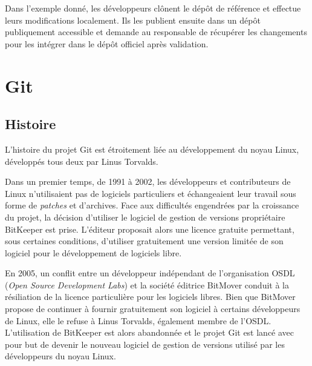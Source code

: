 \documentclass[11pt,a4paper]{article}
\begin{document}
Dans l'exemple donné, les développeurs clônent le dépôt de référence et effectue leurs modifications localement.
Ils les publient ensuite dans un dépôt publiquement accessible et demande au responsable de récupérer les changements pour les intégrer dans le dépôt officiel après validation.


\section{Git}


\subsection{Histoire}

L'histoire du projet Git est étroitement liée au développement du noyau Linux, développés tous deux par Linus Torvalds.

Dans un premier temps, de 1991 à 2002, les développeurs et contributeurs de Linux n'utilisaient pas de logiciels particuliers et échangeaient leur travail sous forme de \textit{patches} et d'archives.
Face aux difficultés engendrées par la croissance du projet, la décision d'utiliser le logiciel de gestion de versions propriétaire BitKeeper est prise.
L'éditeur proposait alors une licence gratuite permettant, sous certaines conditions, d'utiliser gratuitement une version limitée de son logiciel pour le développement de logiciels libre.

En 2005, un conflit entre un développeur indépendant de l'organisation OSDL (\textit{Open Source Development Labs}) et la société éditrice BitMover conduit à la résiliation de la licence particulière pour les logiciels libres.
Bien que BitMover propose de continuer à fournir gratuitement son logiciel à certains développeurs de Linux, elle le refuse à Linus Torvalds, également membre de l'OSDL.
L'utilisation de BitKeeper est alors abandonnée et le projet Git est lancé avec pour but de devenir le nouveau logiciel de gestion de versions utilisé par les développeurs du noyau Linux.
\end{document}

